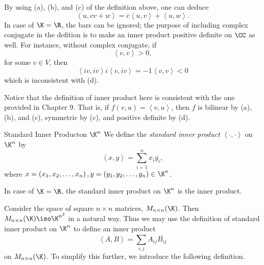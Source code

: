 \documentclass[linearalgebra]{subfiles}
\begin{document}
    \begin{remark}
        By using (a), (b), and (c) of the definition above, one can deduce
        \begin{equation*}
            \left\langle u, cv+w\right\rangle  = \overline{c}\left\langle u, v\right\rangle  + \left\langle u, w\right\rangle  .
        \end{equation*}
        In case of $\K=\R$, the bars can be ignored; the purpose of including complex conjugate in the defition is to make an inner product positive definite on $\CC$ as well. For instance, without complex conjugate, if
        \begin{equation*}
            \left\langle v, v\right\rangle  > 0,
        \end{equation*}
        for some $v\in V$, then
        \begin{equation*}
            \left\langle iv, iv\right\rangle i\left\langle v, iv\right\rangle = -1\left\langle v, v\right\rangle < 0
        \end{equation*}
        which is inconsistent with (d).
    \end{remark}

    \begin{remark}
        Notice that the definition of inner product here is consistent with the one provided in Chapter 9. That is, if $f(v,u) = \left\langle v, u\right\rangle $, then $f$ is bilinear by (a), (b), and (c), symmetric by (c), and positive definite by (d).
    \end{remark}

    \clearpage
    \begin{definition}{Standard Inner Product}{on $\K^n$}
        We define the \emph{standard inner product} $\left\langle \cdot, \cdot\right\rangle $ on $\K^n$ by
        \begin{equation*}
            \left\langle x, y\right\rangle  = \sum^{n}_{i=1} x_i\overline{y_i},
        \end{equation*}
        where $x=\left( x_1,x_2,\ldots,x_n \right), y = \left( y_1,y_2,\ldots,y_n \right)\in\K^n$.
    \end{definition}

    \begin{remark}
        In case of $\K = \R$, the standard inner product on $\K^n$ is the inner product.
    \end{remark}

    \begin{remark}
        Consider the space of square $n\times n$ matrices, $M_{n\times n}(\K)$. Then $M_{n\times n}(\K)\iso\K^{n^2}$ in a natural way. Thus we may use the definition of standard inner product on $\K^n$ to define an inner product
        \begin{equation*}
            \left\langle A, B\right\rangle = \sum^{}_{i,j} A_{ij}\overline{B_{ij}}
        \end{equation*}
        on $M_{n\times n}(\K)$. To simplify this further, we introduce the following definition.
    \end{remark}
\end{document}
